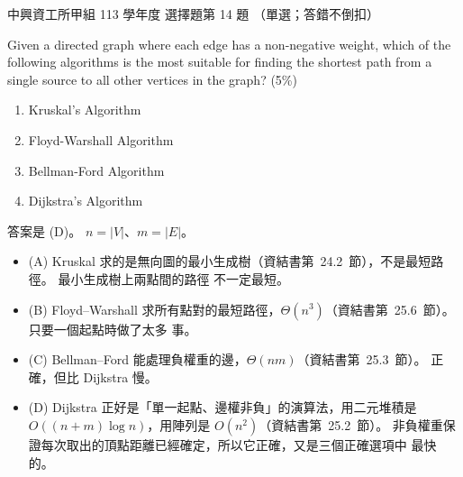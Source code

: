 \begin{pastexam}[label={px:nchu-113-dsa-14}]{中興資工所甲組 113 學年度 選擇題第 14 題}
（單選；答錯不倒扣）

Given a directed graph where each edge has a non-negative weight, which of the following algorithms is the
most suitable for finding the shortest path from a single source to all other vertices in the graph? (5\%)
\begin{enumerate}[label=(\Alph*)]
\item Kruskal's Algorithm
\item Floyd-Warshall Algorithm
\item Bellman-Ford Algorithm
\item Dijkstra's Algorithm
\end{enumerate}
\end{pastexam}

\begin{pastsoln}
答案是 (D)。 $n = |V|$、$m = |E|$。
\begin{itemize}
\item (A) Kruskal 求的是無向圖的最小生成樹（資結書第~24.2~節），不是最短路徑。 最小生成樹上兩點間的路徑
不一定最短。
\item (B) Floyd--Warshall 求所有點對的最短路徑，$\Theta(n^3)$（資結書第~25.6~節）。 只要一個起點時做了太多
事。
\item (C) Bellman--Ford 能處理負權重的邊，$\Theta(nm)$（資結書第~25.3~節）。 正確，但比 Dijkstra 慢。
\item (D) Dijkstra 正好是「單一起點、邊權非負」的演算法，用二元堆積是 $O((n + m)\log n)$，用陣列是
$O(n^2)$（資結書第~25.2~節）。 非負權重保證每次取出的頂點距離已經確定，所以它正確，又是三個正確選項中
最快的。
\end{itemize}
\end{pastsoln}
